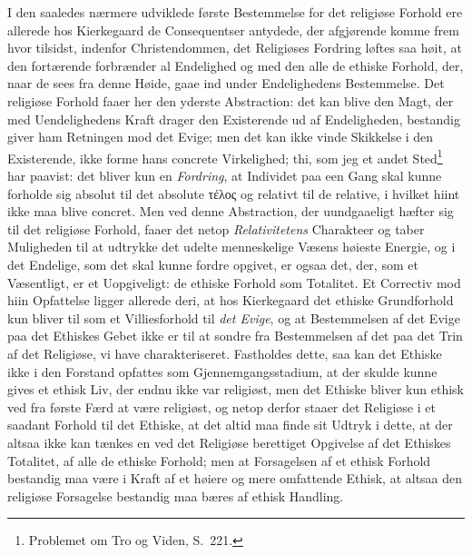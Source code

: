 I den saaledes nærmere udviklede første Bestemmelse for det religiøse Forhold
ere allerede hos Kierkegaard de Consequentser antydede, der afgjørende komme
frem hvor tilsidst, indenfor Christendommen, det Religiøses Fordring løftes
saa høit, at den fortærende forbrænder al Endelighed og med den alle de
ethiske Forhold, der, naar de sees fra denne Høide, gaae ind under
Endelighedens Bestemmelse. Det religiøse Forhold faaer her den yderste
Abstraction: det kan blive den Magt, der med Uendelighedens Kraft drager den
Existerende ud af Endeligheden, bestandig giver ham Retningen mod det Evige;
men det kan ikke vinde Skikkelse i den Existerende, ikke forme hans concrete
Virkelighed; thi, som jeg et andet Sted\footnote{Problemet om Tro og Viden,
S.\ 221.} har paavist: det bliver kun en \emph{Fordring}, at Individet paa een
Gang skal kunne forholde sig absolut til det absolute τέλος og relativt til de
relative,
 i hvilket hiint ikke maa blive concret. Men ved denne Abstraction, der
uundgaaeligt hæfter sig til det religiøse Forhold, faaer det netop
\emph{Relativitetens} Charakteer og taber Muligheden til at udtrykke det
udelte menneskelige Væsens høieste Energie, og i det Endelige, som det skal
kunne fordre opgivet, er ogsaa det, der, som et Væsentligt, er et Uopgiveligt:
de ethiske Forhold som Totalitet. Et Correctiv mod hiin Opfattelse ligger
allerede deri, at hos Kierkegaard det ethiske Grundforhold kun bliver til som
et Villiesforhold til \emph{det Evige}, og at Bestemmelsen af det Evige paa
det Ethiskes Gebet ikke er til at sondre fra Bestemmelsen af det paa det Trin
af det Religiøse, vi have charakteriseret. Fastholdes dette, saa kan det
Ethiske ikke i den Forstand opfattes som Gjennemgangsstadium, at der skulde
kunne gives et ethisk Liv, der endnu ikke var religiøst, men det Ethiske
bliver kun ethisk ved fra første Færd at være religiøst, og netop derfor
staaer det Religiøse i et saadant Forhold til det Ethiske, at det altid maa
finde sit Udtryk i dette, at der altsaa ikke kan tænkes en ved det Religiøse
berettiget Opgivelse af det Ethiskes Totalitet, af alle de ethiske Forhold;
men at Forsagelsen af et ethisk Forhold bestandig maa være i Kraft af et
høiere og mere omfattende Ethisk, at altsaa den religiøse Forsagelse bestandig
maa bæres af ethisk Handling.

